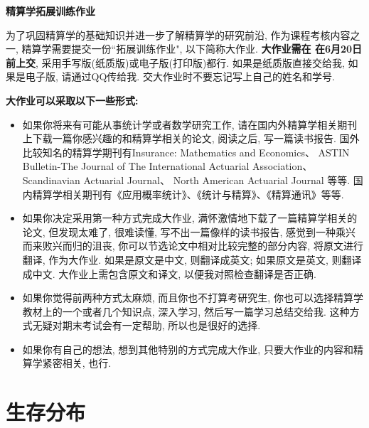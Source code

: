 \documentclass[a4paper,openany, 10pt]{ctexbook}
\def\red{\color{red}}
\begin{document}
\newpage
{}
\begin{center}
  {\bf\Large \heiti 精算学拓展训练作业}

\end{center}
\vspace{.5cm}


{\large
为了巩固精算学的基础知识并进一步了解精算学的研究前沿, 作为课程考核内容之一,
精算学需要提交一份``拓展训练作业", 以下简称大作业. {\red\bf 大作业需在 在6月20日前上交}, 采用手写版(纸质版)或电子版(打印版)都行. 如果是纸质版直接交给我, 如果是电子版, 请通过QQ传给我. 交大作业时不要忘记写上自己的姓名和学号.

\vspace{.3cm}

{\bf\heiti 大作业可以采取以下一些形式:}
\begin{itemize}
  \item[{\bf1.}] 如果你将来有可能从事统计学或者数学研究工作, 请在国内外精算学相关期刊上下载一篇你感兴趣的和精算学相关的论文, 阅读之后, 写一篇读书报告. 国外比较知名的精算学期刊有Insurance: Mathematics and Economics、 ASTIN Bulletin-The Journal of The International Actuarial Association、 Scandinavian Actuarial Journal、 North American Actuarial Journal 等等. 国内精算学相关期刊有《应用概率统计》、《统计与精算》、《精算通讯》等等.

      \item[{\bf2.}] 如果你决定采用第一种方式完成大作业, 满怀激情地下载了一篇精算学相关的论文, 但发现太难了, 很难读懂, 写不出一篇像样的读书报告, 感觉到一种乘兴而来败兴而归的沮丧,  你可以节选论文中相对比较完整的部分内容, 将原文进行翻译, 作为大作业. 如果是原文是中文, 则翻译成英文; 如果原文是英文, 则翻译成中文. 大作业上需包含原文和译文, 以便我对照检查翻译是否正确.


\item[{\bf3.}] 如果你觉得前两种方式太麻烦, 而且你也不打算考研究生, 你也可以选择精算学教材上的一个或者几个知识点, 深入学习, 然后写一篇学习总结交给我. 这种方式无疑对期末考试会有一定帮助, 所以也是很好的选择.

\item[{\bf4.}] 如果你有自己的想法, 想到其他特别的方式完成大作业, 只要大作业的内容和精算学紧密相关, 也行.
\end{itemize}


}

\tableofcontents
\mainmatter

\chapter{生存分布}
\end{document}
